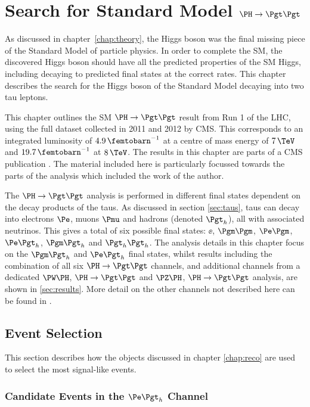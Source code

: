 \chapter{Search for Standard Model $\PH \to \Pgt\Pgt$}
\label{chap:htt-sm}

As discussed in chapter~\ref{chap:theory}, the Higgs boson was the final missing 
piece of the Standard Model of particle physics. In order to complete the
\ac{SM}, the discovered Higgs boson should have all the predicted properties of the
\ac{SM} Higgs, including decaying to predicted final states at the correct rates. This
chapter describes the search for the Higgs boson of the Standard Model 
decaying into two tau leptons.

This chapter outlines the \ac{SM} $\HToTauTau$ result from Run 1 of the LHC, using the
full dataset collected in 2011 and 2012 by CMS. This corresponds to an
integrated luminosity of $4.9\,\femtobarn^{-1}$ at a centre of mass energy of $7\,\TeV$ and
$19.7\,\femtobarn^{-1}$ at $8\,\TeV$. The results in this chapter are parts of a CMS publication 
\cite{HIG-13-004}. The material included 
here is particularly focussed towards the parts of the analysis which 
included the work of the author. 

The $\HToTauTau$ analysis is performed in different final states dependent
on the decay products of the taus. As discussed in section
\ref{sec:taus}, taus can decay into electrons $\Pe$,
muons $\Pmu$ and hadrons (denoted $\Pgth$), all with associated neutrinos.
This gives a total of six possible final states: $\ee$, $\mumu$, $\emu$,
$\etau$, $\mutau$ and $\tautau$. The analysis details in this chapter focus on
the $\mutau$ and $\etau$ final states, whilst results including the combination of all
six $\HToTauTau$ channels, and additional channels from a dedicated $\PW\PH$, $\PH\to\Pgt\Pgt$ and
$\PZ\PH$, $\PH\to\Pgt\Pgt$ analysis, are shown in \ref{sec:results}. More detail on the other channels
not described here can be found in \cite{HIG-13-004}. 

\section{Event Selection}
\label{sec:eventSelection}

This section describes how the objects discussed in chapter
\ref{chap:reco} are used to select the most signal-like events. 

\subsection{Candidate Events in the $\etau$ Channel}

